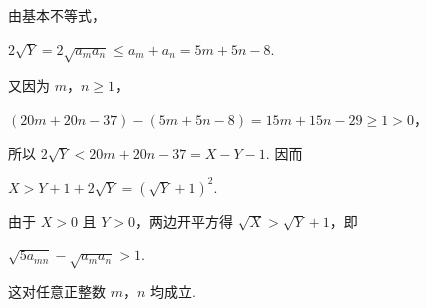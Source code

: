 \begin{solution}
\begin{enumerate}
由基本不等式，

\(2\sqrt{Y}=2\sqrt{a_ma_n}\leqslant a_m+a_n=5m+5n-8\).

又因为 \(m\)，\(n\geqslant1\)，

\((20m+20n-37)-(5m+5n-8)=15m+15n-29\geqslant1>0\)，

所以 \(2\sqrt{Y}<20m+20n-37=X-Y-1\). 因而

\(X>Y+1+2\sqrt{Y}=(\sqrt{Y}+1)^2\).

由于 \(X>0\) 且 \(Y>0\)，两边开平方得 \(\sqrt{X}>\sqrt{Y}+1\)，即

\(\sqrt{5a_{mn}}-\sqrt{a_ma_n}>1\).

这对任意正整数 \(m\)，\(n\) 均成立.
\end{enumerate}
\end{solution}
